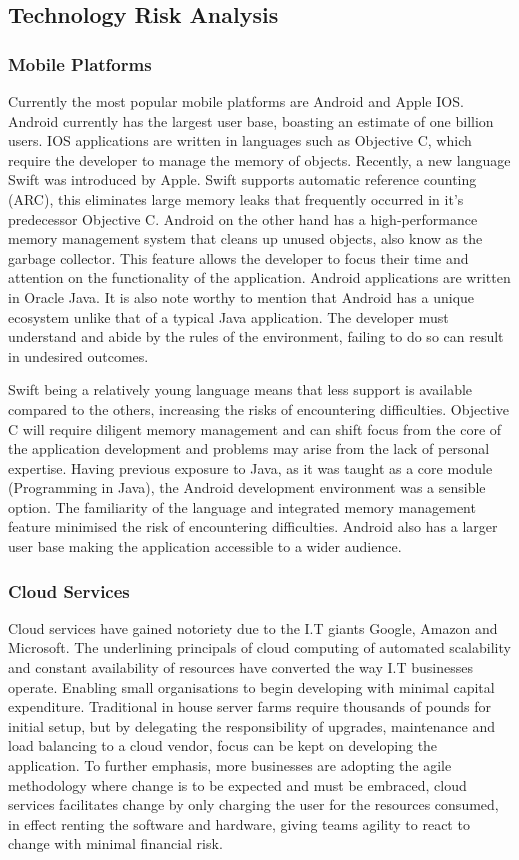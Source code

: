 \documentclass[a4paper, 11pt]{article}
\begin{document}
\subsection{Technology Risk Analysis}
\subsubsection{Mobile Platforms}
Currently the most popular mobile platforms are Android and Apple IOS. Android currently has the largest user base, boasting an estimate of one billion users. IOS applications are written in languages such as Objective C, which require the developer to manage the memory of objects. Recently, a new language Swift was introduced by Apple. Swift supports automatic reference counting (ARC), this eliminates large memory leaks that frequently occurred in it's predecessor Objective C. Android on the other hand has a high-performance memory management system that cleans up unused objects, also know as the garbage collector. This feature allows the developer to focus their time and attention on the functionality of the application. Android applications are written in Oracle Java. It is also note worthy to mention that Android has a unique ecosystem unlike that of a typical Java application. The developer must understand and abide by the rules of the environment, failing to do so can result in undesired outcomes. \cite{android}\cite{iOS}

Swift being a relatively young language means that less support is available compared to the others, increasing the risks of encountering difficulties. Objective C will require diligent memory management and can shift focus from the core of the application development and problems may arise from the lack of personal expertise. Having previous exposure to Java, as it was taught as a core module (Programming in Java), the Android development environment was a sensible option. The familiarity of the language and integrated memory management feature minimised the risk of encountering difficulties. Android also has a larger user base making the application accessible to a wider audience.

\subsubsection{Cloud Services} 
Cloud services have gained notoriety due to the I.T giants Google, Amazon and Microsoft. The underlining principals of cloud computing of automated scalability and constant availability of resources have converted the way I.T businesses operate. Enabling small organisations to begin developing with minimal capital expenditure. Traditional in house server farms require thousands of pounds for initial setup, but by delegating the responsibility of upgrades, maintenance and load balancing to a cloud vendor, focus can be kept on developing the application. To further emphasis, more businesses are adopting the agile methodology where change is to be expected and must be embraced\cite{agile}, cloud services facilitates change by only charging the user for the resources consumed, in effect renting the software and hardware, giving teams agility to react to change with minimal financial risk.
\end{document}
